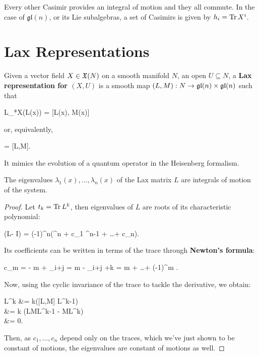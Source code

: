 \documentclass[main.tex]{subfiles}
\begin{document}
Every other Casimir provides an integral of motion and they all commute. In the case of $\mathfrak{gl}(n)$, or its Lie subalgebras, a set of Casimirs is given by $h_i = \operatorname{Tr} X^i$.

\section{Lax Representations}
\begin{definition}
	Given a vector field $X \in \mathfrak{X}(N)$ on a smooth manifold $N$, an open $U \subseteq N$, a \textbf{Lax representation for $(X, U)$} is a smooth map $(L, M) : N \to \mathfrak{gl}(n) \times \mathfrak{gl}(n)$ such that
	\begin{eqalign}
		L_*X(L(x)) = [L(x), M(x)]
	\end{eqalign}
	or, equivalently,
	\begin{eqalign}
		 = [L,M].
	\end{eqalign}
\end{definition}

It mimics the evolution of a quantum operator in the Heisenberg formalism.

\begin{proposition}
	The eigenvalues $\lambda_1(x), \ldots, \lambda_n(x)$ of the Lax matrix $L$ are integrals of motion of the system.
\end{proposition}
\begin{proof}
	Let $t_k = \operatorname{Tr} L^k$, then eigenvalues of $L$ are roots of its characteristic polynomial:
	\begin{eqalign}
		\det(L- \lambda I) = (-1)^n(\lambda^n + c_1 \lambda^{n-1} + \ldots + c_n).
	\end{eqalign}
	Its coefficients can be written in terms of the trace through \textbf{Newton's formula}:
	\begin{eqalign}
		c_m = - m +  \sum_{i+j = m}  -  \sum_{i+j +k = m}  + \ldots + (-1)^m \frac{t_1^m}{m!}.
	\end{eqalign}
	Now, using the cyclic invariance of the trace to tackle the derivative, we obtain:
	\begin{eqalign}
		 \trace L^k &= k\trace ([L,M] L^{k-1})\\
			&= k \trace (LML^{k-1} - ML^k)\\
			&= 0.
	\end{eqalign}
	Then, as $c_1, \ldots, c_n$ depend only on the traces, which we've just shown to be constant of motions, the eigenvalues are constant of motions as well.
\end{proof}
\end{document}
